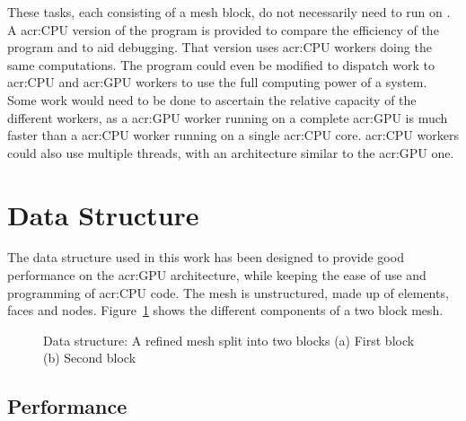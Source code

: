 These tasks, each consisting of a mesh block, do not necessarily need to run on
. A \acrshort{acr:CPU} version of the program is provided to compare the
efficiency of the program and to aid debugging. That version uses \acrshort{acr:CPU} workers doing
the same computations. The program could even be modified to dispatch work to \acrshort{acr:CPU} and
\acrshort{acr:GPU} workers to use the full computing power of a system. Some work would need to be
done to ascertain the relative capacity of the different workers, as a \acrshort{acr:GPU} worker
running on a complete \acrshort{acr:GPU} is much faster than a \acrshort{acr:CPU} worker running on
a single \acrshort{acr:CPU} core. \Acrshort{acr:CPU} workers could also use multiple threads, with
an architecture similar to the \acrshort{acr:GPU} one.

\section{Data Structure}\label{section:graphics_processing_units:data_structure}

The data structure used in this work has been designed to provide good performance on the
\acrshort{acr:GPU} architecture, while keeping the ease of use and programming of \acrshort{acr:CPU}
code. The mesh is unstructured, made up of elements, faces and nodes.
Figure~\ref{fig:mesh_structure} shows the different components of a two block mesh.

\begin{figure}[H]
	\centering
	\hfill
	\caption{Data structure: A refined mesh split into two blocks (a) First block (b) Second block}\label{fig:mesh_structure}
\end{figure}

\subsection{Performance}\label{subsection:graphics_processing_units:data_structure:performance}

